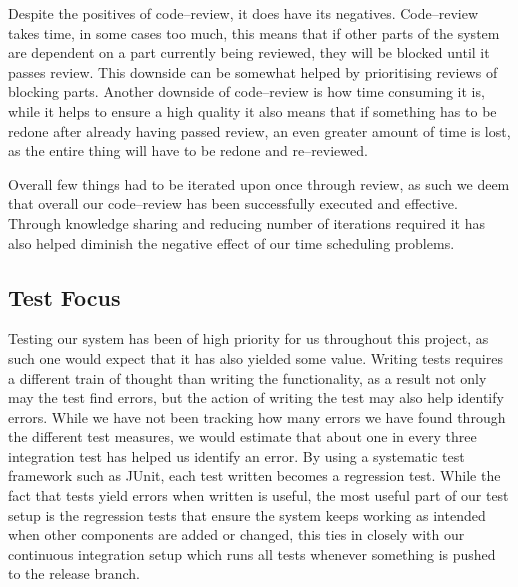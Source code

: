\bigskip
Despite the positives of code--review, it does have its negatives.
Code--review takes time, in some cases too much, this means that if other parts of the system are dependent on a part currently being reviewed, they will be blocked until it passes review.
This downside can be somewhat helped by prioritising reviews of blocking parts.
Another downside of code--review is how time consuming it is, while it helps to ensure a high quality it also means that if something has to be redone after already having passed review, an even greater amount of time is lost, as the entire thing will have to be redone and re--reviewed.

Overall few things had to be iterated upon once through review, as such we deem that overall our code--review has been successfully executed and effective.
Through knowledge sharing and reducing number of iterations required it has also helped diminish the negative effect of our time scheduling problems.
\subsection{Test Focus}
Testing our system has been of high priority for us throughout this project, as such one would expect that it has also yielded some value.
Writing tests requires a different train of thought than writing the functionality, as a result not only may the test find errors, but the action of writing the test may also help identify errors.
While we have not been tracking how many errors we have found through the different test measures, we would estimate that about one in every three integration test has helped us identify an error.
By using a systematic test framework such as JUnit, each test written becomes a regression test.
While the fact that tests yield errors when written is useful, the most useful part of our test setup is the regression tests that ensure the system keeps working as intended when other components are added or changed, this ties in closely with our continuous integration setup which runs all tests whenever something is pushed to the release branch.

